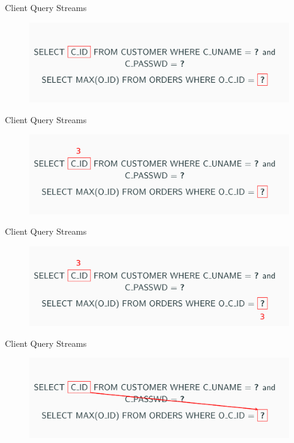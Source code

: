 \documentclass[10pt]{beamer}
\begin{document}
\begin{frame}[fragile]{Client Query Streams}
    \begin{figure}
        \includegraphics[scale=0.25]{apollo_parameter_mappings}
    \end{figure}
\end{frame}

\begin{frame}[fragile]{Client Query Streams}
    \begin{figure}
        \includegraphics[scale=0.25]{apollo_parameter_mappings_2}
    \end{figure}
\end{frame}

\begin{frame}[fragile]{Client Query Streams}
    \begin{figure}
        \includegraphics[scale=0.25]{apollo_parameter_mappings_3}
    \end{figure}
\end{frame}

\begin{frame}[fragile]{Client Query Streams}
    \begin{figure}
        \includegraphics[scale=0.25]{apollo_parameter_mappings_4}
    \end{figure}
\end{frame}
\end{document}
